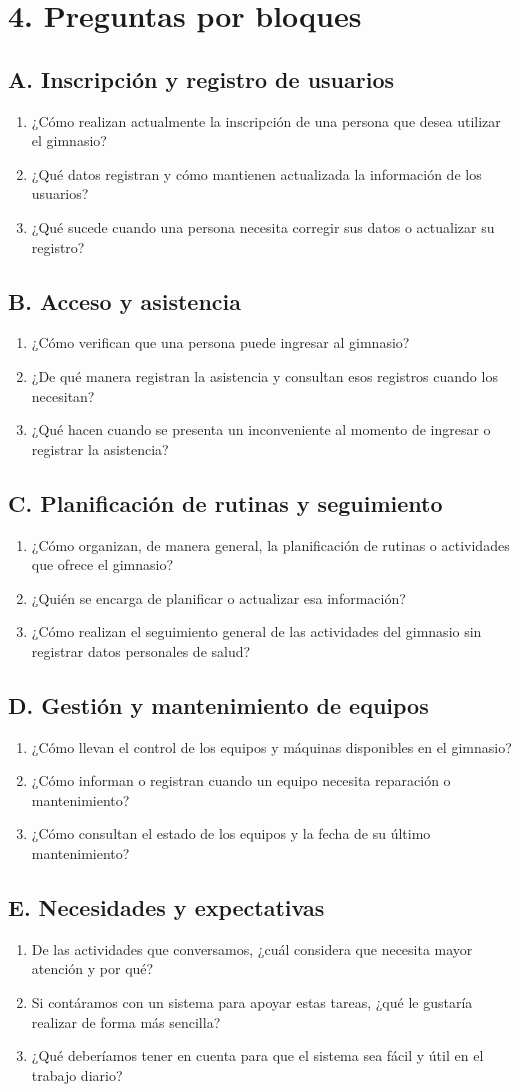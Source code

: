 \documentclass[10pt,letterpaper]{article}
\newcommand{\titulo}[1]{\section*{\textcolor{azul}{#1}}}
\newcommand{\bloque}[1]{\subsection*{\textcolor{azul}{#1}}}
\begin{document}
\titulo{4. Preguntas por bloques}

\bloque{A. Inscripción y registro de usuarios}
\begin{enumerate}[leftmargin=*,itemsep=3pt]
\item ¿Cómo realizan actualmente la inscripción de una persona que desea utilizar el gimnasio?
\item ¿Qué datos registran y cómo mantienen actualizada la información de los usuarios?
\item ¿Qué sucede cuando una persona necesita corregir sus datos o actualizar su registro?
\end{enumerate}

\bloque{B. Acceso y asistencia}
\begin{enumerate}[leftmargin=*,itemsep=3pt]
\item ¿Cómo verifican que una persona puede ingresar al gimnasio?
\item ¿De qué manera registran la asistencia y consultan esos registros cuando los necesitan?
\item ¿Qué hacen cuando se presenta un inconveniente al momento de ingresar o registrar la asistencia?
\end{enumerate}

\bloque{C. Planificación de rutinas y seguimiento}
\begin{enumerate}[leftmargin=*,itemsep=3pt]
\item ¿Cómo organizan, de manera general, la planificación de rutinas o actividades que ofrece el gimnasio?
\item ¿Quién se encarga de planificar o actualizar esa información?
\item ¿Cómo realizan el seguimiento general de las actividades del gimnasio sin registrar datos personales de salud?
\end{enumerate}

\bloque{D. Gestión y mantenimiento de equipos}
\begin{enumerate}[leftmargin=*,itemsep=3pt]
\item ¿Cómo llevan el control de los equipos y máquinas disponibles en el gimnasio?
\item ¿Cómo informan o registran cuando un equipo necesita reparación o mantenimiento?
\item ¿Cómo consultan el estado de los equipos y la fecha de su último mantenimiento?
\end{enumerate}

\bloque{E. Necesidades y expectativas}
\begin{enumerate}[leftmargin=*,itemsep=3pt]
\item De las actividades que conversamos, ¿cuál considera que necesita mayor atención y por qué?
\item Si contáramos con un sistema para apoyar estas tareas, ¿qué le gustaría realizar de forma más sencilla?
\item ¿Qué deberíamos tener en cuenta para que el sistema sea fácil y útil en el trabajo diario?
\end{enumerate}
\end{document}
